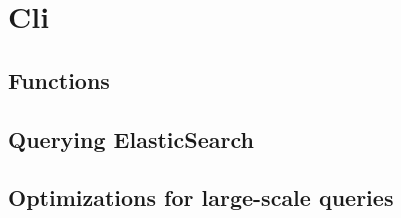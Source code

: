 \section{Cli}

\subsection{Functions}
\subsection{Querying ElasticSearch}
\subsection{Optimizations for large-scale queries}
